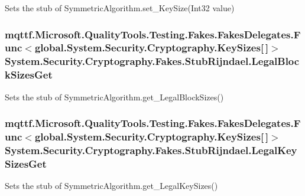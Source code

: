 Sets the stub of Symmetric\-Algorithm.\-set\-\_\-\-Key\-Size(\-Int32 value)

\hypertarget{class_system_1_1_security_1_1_cryptography_1_1_fakes_1_1_stub_rijndael_aa94839a269c1c40aaccf7976bc11fe31}{
\subsubsection[{Legal\-Block\-Sizes\-Get}]{\setlength{\rightskip}{0pt plus 5cm}mqttf.\-Microsoft.\-Quality\-Tools.\-Testing.\-Fakes.\-Fakes\-Delegates.\-Func$<$global.\-System.\-Security.\-Cryptography.\-Key\-Sizes\mbox{[}$\,$\mbox{]}$>$ System.\-Security.\-Cryptography.\-Fakes.\-Stub\-Rijndael.\-Legal\-Block\-Sizes\-Get}}\label{class_system_1_1_security_1_1_cryptography_1_1_fakes_1_1_stub_rijndael_aa94839a269c1c40aaccf7976bc11fe31}


Sets the stub of Symmetric\-Algorithm.\-get\-\_\-\-Legal\-Block\-Sizes()

\hypertarget{class_system_1_1_security_1_1_cryptography_1_1_fakes_1_1_stub_rijndael_abe921c91113dde86d7cad727db2990ca}{
\subsubsection[{Legal\-Key\-Sizes\-Get}]{\setlength{\rightskip}{0pt plus 5cm}mqttf.\-Microsoft.\-Quality\-Tools.\-Testing.\-Fakes.\-Fakes\-Delegates.\-Func$<$global.\-System.\-Security.\-Cryptography.\-Key\-Sizes\mbox{[}$\,$\mbox{]}$>$ System.\-Security.\-Cryptography.\-Fakes.\-Stub\-Rijndael.\-Legal\-Key\-Sizes\-Get}}\label{class_system_1_1_security_1_1_cryptography_1_1_fakes_1_1_stub_rijndael_abe921c91113dde86d7cad727db2990ca}


Sets the stub of Symmetric\-Algorithm.\-get\-\_\-\-Legal\-Key\-Sizes()

